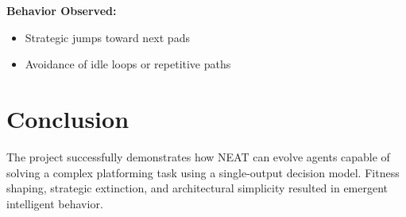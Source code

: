 \documentclass[10pt,conference]{IEEEtran}
\begin{document}
\textbf{Behavior Observed:}
\begin{itemize}
    \item Strategic jumps toward next pads
    \item Avoidance of idle loops or repetitive paths
\end{itemize}

\section{Conclusion}
The project successfully demonstrates how NEAT can evolve agents capable of solving a complex platforming task using a single-output decision model. Fitness shaping, strategic extinction, and architectural simplicity resulted in emergent intelligent behavior.
\end{document}
